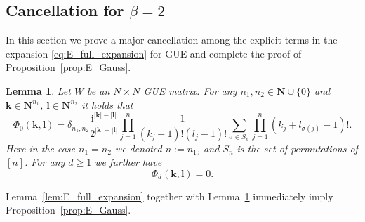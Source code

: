 \documentclass[10pt]{amsart}
\newtheorem{lemma}[theorem]{Lemma}
\numberwithin{equation}{section}
\newcommand{\N}{\mathbf{N}}
\newcommand{\ii}{\mathrm{i}}
\begin{document}
\subsection{Cancellation for $\beta=2$}\label{sec:E_cancel} In this section we prove a major cancellation among the explicit terms in the expansion \eqref{eq:E_full_expansion} for GUE and complete the proof of Proposition~\ref{prop:E_Gauss}.

\begin{lemma}\label{lem:Phi_expl} Let $W$ be an $N\times N$ GUE matrix. For any $n_1,n_2\in \N\cup\{0\}$ and $\bm{k}\in \N^{n_1}$, $\bm{l}\in \N^{n_2}$ it holds that
\begin{equation}
\Phi_0(\bm{k},\bm{l})=\delta_{n_1,n_2}\frac{\ii^{|\bm{k}|-|\bm{l}|}}{2^{|\bm{k}|+|\bm{l}|}} \prod_{j=1}^n \frac{1}{(k_j-1)!(l_j-1)!}\sum_{\sigma\in S_{n}} \prod_{j=1}^n (k_j+l_{\sigma(j)}-1)!. 
\label{eq:Phi_0_expl}
\end{equation}
Here in the case $n_1=n_2$ we denoted $n:=n_1$, and $S_n$ is the set of permutations of $[n]$. For any $d\ge 1$ we further have
\begin{equation}
\Phi_d(\bm{k},\bm{l})=0.
\label{eq:Phi_vanish}
\end{equation}
\end{lemma}

Lemma~\ref{lem:E_full_expansion} together with Lemma~\ref{lem:Phi_expl} immediately imply Proposition~\ref{prop:E_Gauss}. 
\end{document}
